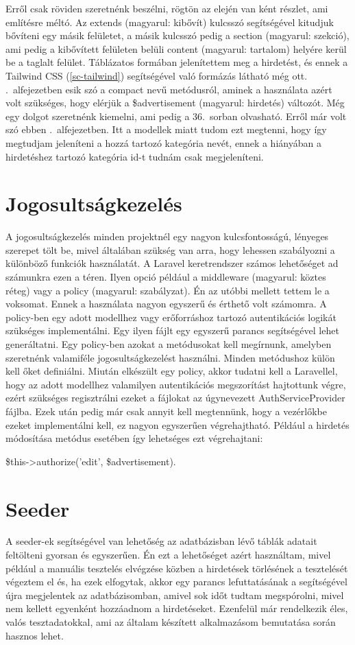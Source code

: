 \documentclass[]{thesis-ekf}
\theoremstyle{definition}
\theoremstyle{remark}
\begin{document}
		Erről csak röviden szeretnénk beszélni, rögtön az elején van ként részlet, ami említésre méltó. Az extends (magyarul: kibővít) kulcsszó segítségével kitudjuk bővíteni egy másik felületet, a másik kulcsszó pedig a section (magyarul: szekció), ami pedig a kibővített felületen belüli content (magyarul: tartalom) helyére kerül be a taglalt felület. Táblázatos formában jelenítettem meg a hirdetést, és ennek a Tailwind CSS (\ref{sc-tailwind}) segítségével való formázás látható még ott. .~alfejezetben esik szó a compact nevű metódusról, aminek a használata azért volt szükséges, hogy elérjük a \$advertisement (magyarul: hirdetés) változót. Még egy dolgot szeretnénk kiemelni, ami pedig a 36.~sorban olvasható. Erről már volt szó ebben .~alfejezetben. Itt a modellek miatt tudom ezt megtenni, hogy így megtudjam jeleníteni a hozzá tartozó kategória nevét, ennek a hiányában a hirdetéshez tartozó kategória id-t tudnám csak megjeleníteni.
	\section{Jogosultságkezelés}
		A jogosultságkezelés minden projektnél egy nagyon kulcsfontosságú, lényeges szerepet tölt be, mivel általában szükség van arra, hogy lehessen szabályozni a különböző funkciók használatát. A Laravel keretrendszer számos lehetőséget ad számunkra ezen a téren. Ilyen opció például a middleware (magyarul: köztes réteg) vagy a policy (magyarul: szabályzat). Én az utóbbi mellett tettem le a voksomat. Ennek a használata nagyon egyszerű és érthető volt számomra. A policy-ben egy adott modellhez vagy erőforráshoz tartozó autentikációs logikát szükséges implementálni. Egy ilyen fájlt egy egyszerű parancs segítségével lehet generáltatni. Egy policy-ben azokat a metódusokat kell megírnunk, amelyben szeretnénk valamiféle jogosultságkezelést használni. Minden metódushoz külön kell őket definiálni. Miután elkészült egy policy, akkor tudatni kell a Laravellel, hogy az adott modellhez valamilyen autentikációs megszorítást hajtottunk végre, ezért szükséges regisztrálni ezeket a fájlokat az úgynevezett AuthServiceProvider fájlba. Ezek után pedig már csak annyit kell megtennünk, hogy a vezérlőkbe ezeket implementálni kell, ez nagyon egyszerűen végrehajtható. Például a hirdetés módosítása metódus esetében így lehetséges ezt végrehajtani: 
		\begin{center}
			\$this->authorize('edit', \$advertisement).
		\end{center}
		\cite{Laravel}
	\section{Seeder}
		A seeder-ek segítségével van lehetőség az adatbázisban lévő táblák adatait feltölteni gyorsan és egyszerűen. Én ezt a lehetőséget azért használtam, mivel például a manuális tesztelés elvégzése közben a hirdetések törlésének a tesztelését végeztem el és, ha ezek elfogytak, akkor egy parancs lefuttatásának a segítségével újra megjelentek az adatbázisomban, amivel sok időt tudtam megspórolni, mivel nem kellett egyenként hozzáadnom a hirdetéseket. Ezenfelül már rendelkezik éles, valós tesztadatokkal, ami az általam készített alkalmazásom bemutatása során hasznos lehet. 
	
\end{document}
